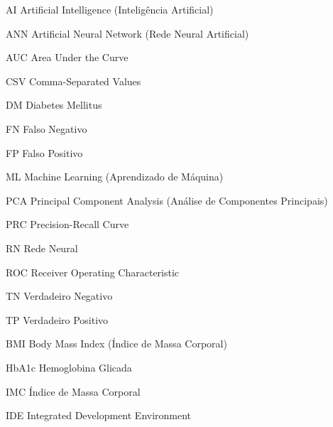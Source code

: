 
\begin{siglas}
	\item[AI] Artificial Intelligence (Inteligência Artificial)
	\item[ANN] Artificial Neural Network (Rede Neural Artificial)
	\item[AUC] Area Under the Curve
	\item[CSV] Comma-Separated Values
	\item[DM] Diabetes Mellitus
	\item[FN] Falso Negativo
	\item[FP] Falso Positivo
	\item[ML] Machine Learning (Aprendizado de Máquina)
	\item[PCA] Principal Component Analysis (Análise de Componentes Principais)
	\item[PRC] Precision-Recall Curve
	\item[RN] Rede Neural
	\item[ROC] Receiver Operating Characteristic
	\item[TN] Verdadeiro Negativo
	\item[TP] Verdadeiro Positivo
	\item[BMI] Body Mass Index (Índice de Massa Corporal)
	\item[HbA1c] Hemoglobina Glicada
	\item[IMC] Índice de Massa Corporal
	\item[IDE] Integrated Development Environment
\end{siglas}


